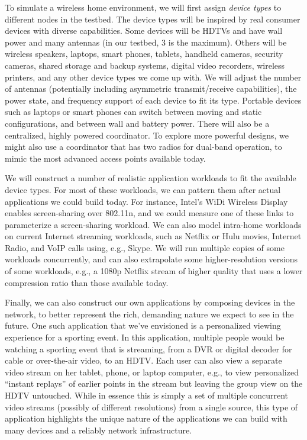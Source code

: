  To simulate a wireless home environment, we will first assign \emph{device types} to different nodes in the testbed. The device types will be inspired by real consumer devices with diverse capabilities. Some devices will be HDTVs and have wall power and many antennas (in our testbed, 3 is the maximum). Others will be wireless speakers, laptops, smart phones, tablets, handheld cameras, security cameras, shared storage and backup systems, digital video recorders,  wireless printers, and any other device types we come up with. We will adjust the number of antennas (potentially including asymmetric transmit/receive capabilities), the power state, and frequency support of each device to fit its type. Portable devices such as laptops or smart phones can switch between moving and static configurations, and between wall and battery power. There will also be a centralized, highly powered coordinator. To explore more powerful designs, we might also use a coordinator that has two radios for dual-band operation, to mimic the most advanced access points available today.

 We will construct a number of realistic application workloads to fit the available device types. For most of these workloads, we can pattern them after actual applications we could build today. For instance, Intel's WiDi Wireless Display enables screen-sharing over 802.11n, and we could measure one of these links to parameterize a screen-sharing workload. We can also model intra-home workloads on current Internet streaming workloads, such as Netflix or Hulu movies, Internet Radio, and VoIP calls using, e.g., Skype. We will run multiple copies of some workloads concurrently, and can also extrapolate some higher-resolution versions of some workloads, e.g., a 1080p Netflix stream of higher quality that uses a lower compression ratio than those available today.

Finally, we can also construct our own applications by composing devices in the network, to better represent the rich, demanding nature we expect to see in the future. One such application that we've envisioned is a personalized viewing experience for a sporting event. In this application, multiple people would be watching a sporting event that is streaming, from a DVR or digital decoder for cable or over-the-air video, to an HDTV. Each user can also view a separate video stream on her tablet, phone, or laptop computer, e.g., to view personalized ``instant replays'' of earlier points in the stream but leaving the group view on the HDTV untouched. While in essence this is simply a set of multiple concurrent video streams  (possibly of different resolutions) from a single source, this type of application highlights the unique nature of the applications we can build with many devices and a reliably network infrastructure.

